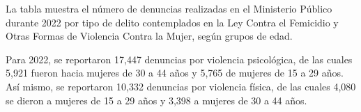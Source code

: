 \justifying La tabla muestra el número de denuncias realizadas en el Ministerio Público durante 2022 por tipo de delito contemplados en la Ley Contra el Femicidio y Otras Formas de Violencia Contra la Mujer, según grupos de edad.

Para 2022, se reportaron 17,447 denuncias por violencia psicológica, de las cuales 5,921 fueron hacia mujeres de 30 a 44 años y 5,765 de mujeres de 15 a 29 años. Así mismo, se reportaron 10,332 denuncias por violencia física, de las cuales 4,080 se dieron a mujeres de 15 a 29 años y 3,398 a mujeres de 30 a 44 años. 